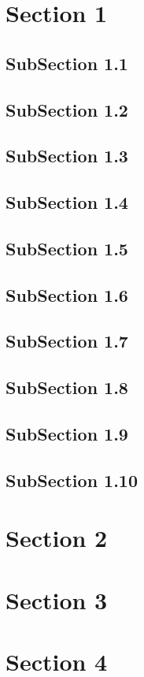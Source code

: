 \documentclass{article}
\begin{document}
\tableofcontents
\section{Section 1}
\subsection{SubSection 1.1}
\subsection{SubSection 1.2}
\subsection{SubSection 1.3}
\subsection{SubSection 1.4}
\subsection{SubSection 1.5}
\subsection{SubSection 1.6}
\subsection{SubSection 1.7}
\subsection{SubSection 1.8}
\subsection{SubSection 1.9}
\subsection{SubSection 1.10}
\section{Section 2}
\section{Section 3}
\section{Section 4}
\end{document}

